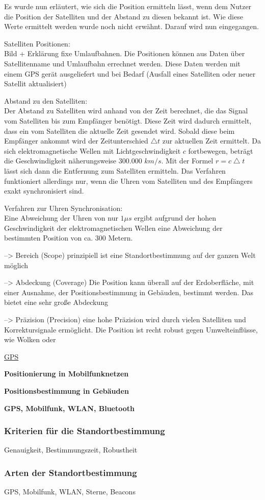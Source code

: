Es wurde nun erläutert, wie sich die Position ermitteln lässt, wenn dem Nutzer die Position der Satelliten und der Abstand zu diesen bekannt ist. Wie diese Werte ermittelt werden wurde noch nicht erwähnt. Darauf wird nun eingegangen.

Satelliten Positionen:\\
Bild + Erklärung fixe Umlaufbahnen. Die Positionen können aus Daten über Satellitenname und Umlaufbahn errechnet werden. Diese Daten werden mit einem GPS gerät ausgeliefert und bei Bedarf (Ausfall eines Satelliten oder neuer Satellit aktualisiert)

Abstand zu den Satelliten:\\
Der Abstand zu Satelliten wird anhand von der Zeit berechnet, die das Signal vom Satelliten bis zum Empfänger benötigt. Diese Zeit wird dadurch ermittelt, dass ein vom Satelliten die aktuelle Zeit gesendet wird. Sobald diese beim Empfänger ankommt wird der Zeitunterschied $ \bigtriangleup t $ zur aktuellen Zeit ermittelt. Da sich elektromagnetische Wellen mit Lichtgeschwindigkeit $ c $ fortbewegen, beträgt die Geschwindigkeit näherungsweise 300.000 $km/s$. Mit der Formel $ r = c \bigtriangleup t$ lässt sich dann die Entfernung zum Satelliten ermitteln. Das Verfahren funktioniert allerdings nur, wenn die Uhren vom Satelliten und des Empfängers exakt synchronisiert sind. 

Verfahren zur Uhren Synchronisation:\\
Eine Abweichung der Uhren von nur $1\mu s$ ergibt aufgrund der hohen Geschwindigkeit der elektromagnetischen Wellen eine Abweichung der bestimmten Position von ca. 300 Metern. \cite[S. 189]{Schiller2004}


--> Bereich (Scope) prinzipiell ist eine Standortbestimmung auf der ganzen Welt möglich

--> Abdeckung (Coverage) Die Position kann überall auf der Erdoberfläche, mit einer Ausnahme, der Positionsbestimmung in Gebäuden, bestimmt werden. Das bietet eine sehr große Abdeckung

--> Präzision (Precision) eine hohe Präzision wird durch vielen Satelliten und Korrektursignale ermöglicht. Die Position ist recht robust gegen Umwelteinflüsse, wie Wolken oder 

\cite{Schiller2004}

\underline{GPS}



\textbf{Positionierung in Mobilfunknetzen}


\textbf{Positionsbestimmung in Gebäuden}



\textbf{GPS, Mobilfunk, WLAN, Bluetooth}

\subsubsection{Kriterien für die Standortbestimmung}
Genauigkeit, Bestimmungszeit, Robustheit


\subsubsection{Arten der Standortbestimmung}
GPS, Mobilfunk, WLAN, Sterne, Beacons